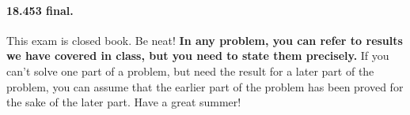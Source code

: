 \documentclass[12pt]{article}
\begin{document}

\paragraph{18.453 final.} This exam is closed book.  Be neat!  {\bf In any problem, you can refer to results we have covered in class, but you need to state them precisely. } If you can't solve one part of a problem, but need the result for a later part of the problem, you can assume that the earlier part of the problem has been proved for the sake of the later part.
Have a great summer! 
 \vspace*{0.1in}


\end{document}
